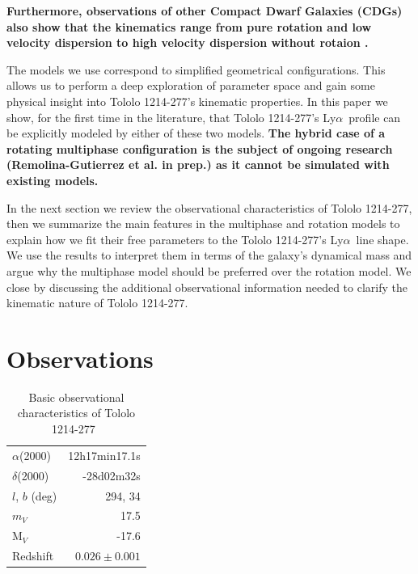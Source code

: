 \documentclass[a4paper,fleqn,usenatbib]{mnras}
\newcommand{\tol}{Tololo 1214-277}
\newcommand{\lya}{\ifmmode{{\rm Ly}\alpha}\else Ly$\alpha$\ \fi}
\begin{document}
{\bf Furthermore, observations of other Compact Dwarf Galaxies (CDGs) also show 
that the kinematics range from pure rotation and low velocity
dispersion to high velocity dispersion without rotaion
\citep{2015A&A...577A..21C,2017A&A...600A.125C}. }


The models we use correspond to simplified geometrical configurations.
This allows us to perform a deep exploration of parameter space and
gain some physical insight into \tol's kinematic properties.
In this paper we show, for the first time in the literature, that \tol's
\lya profile can be explicitly modeled by either of these two
models. 
{\bf The hybrid case of a rotating multiphase configuration
is the subject of ongoing research (Remolina-Gutierrez et al. in
prep.)  as it cannot be simulated with existing models.  }  



In the next section we review the observational characteristics of
\tol, then we summarize the main features in the multiphase and
rotation models to explain how we fit their free parameters 
to the \tol's \lya line shape.
We use the results to interpret them in terms of the galaxy's
dynamical mass and argue why the multiphase model should be preferred
over the rotation model.
We close by discussing the additional observational information needed
to clarify the kinematic nature of \tol. 


\section{Observations}


\begin{table}
\begin{center}
\begin{tabular}{lr}\hline
$\alpha$(2000)& 12h17min17.1s\\
$\delta$(2000)& -28d02m32s\\
$l$, $b$ (deg) & 294, 34\\
$m_V$ & 17.5\\
  M$_V$ & -17.6\\ 
Redshift & $0.026\pm0.001$ \\\hline
\end{tabular}
\end{center}
\caption{Basic observational characteristics of \tol\ 
  \citep{Thuan97}\label{obstable}} 
\end{table}
\end{document}
